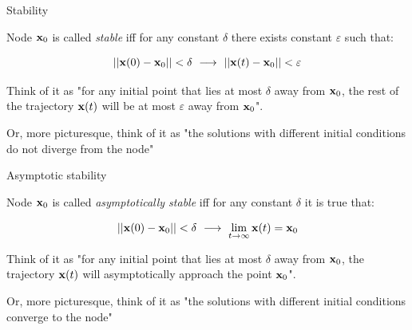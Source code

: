 \documentclass{beamer}
\begin{document}
\begin{frame}{Stability}
\begin{flushleft}

Node $\mathbf{x}_0$ is called \emph{stable} iff for any constant $\delta$ there exists constant $\varepsilon$ such that:

\begin{equation}
    ||\bo{x}(0) - \bo{x}_0|| < \delta \ \longrightarrow \ ||\bo{x}(t) - \bo{x}_0|| < \varepsilon
\end{equation}

\bigskip

Think of it as "for any initial point that lies at most $\delta$ away from $\mathbf{x}_0$, the rest of the trajectory $\mathbf{x}(t)$ will be at most $\varepsilon$ away from $\mathbf{x}_0$".

\bigskip

Or, more picturesque, think of it as "the solutions with different initial conditions do not diverge from the node"

\end{flushleft}
\end{frame}


\begin{frame}{Asymptotic stability}
\begin{flushleft}

Node $\mathbf{x}_0$ is called \emph{asymptotically stable} iff for any constant $\delta$ it is true that:

\begin{equation}
    ||\bo{x}(0) - \bo{x}_0|| < \delta \ \longrightarrow \ 
    \lim_{t\to\infty} \bo{x}(t) = \bo{x}_0
\end{equation}

\bigskip

Think of it as "for any initial point that lies at most $\delta$ away from $\mathbf{x}_0$, the trajectory $\mathbf{x}(t)$ will asymptotically approach the point $\mathbf{x}_0$".

\bigskip

Or, more picturesque, think of it as "the solutions with different initial conditions converge to the node"

\end{flushleft}
\end{frame}
\end{document}
